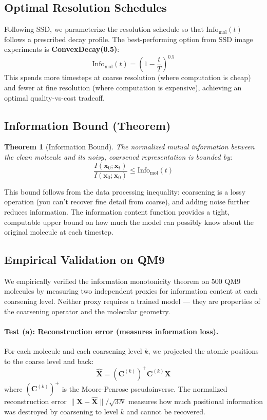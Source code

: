 \documentclass[12pt,a4paper]{article}
\newtheorem{theorem}{Theorem}
\begin{document}
\subsection{Optimal Resolution Schedules}

Following SSD, we parameterize the resolution schedule so that $\text{Info}_{\text{mol}}(t)$ follows a prescribed decay profile. The best-performing option from SSD image experiments is \textbf{ConvexDecay(0.5)}:
\[
\text{Info}_{\text{mol}}(t) = \left(1 - \frac{t}{T}\right)^{0.5}
\]
This spends more timesteps at coarse resolution (where computation is cheap) and fewer at fine resolution (where computation is expensive), achieving an optimal quality-vs-cost tradeoff.

\subsection{Information Bound (Theorem)}

\begin{theorem}[Information Bound]
The normalized mutual information between the clean molecule and its noisy, coarsened representation is bounded by:
\[
\frac{I(\bm{x}_0; \bm{x}_t)}{I(\bm{x}_0; \bm{x}_0)} \leq \text{Info}_{\text{mol}}(t)
\]
\end{theorem}

This bound follows from the data processing inequality: coarsening is a lossy operation (you can't recover fine detail from coarse), and adding noise further reduces information. The information content function provides a tight, computable upper bound on how much the model can possibly know about the original molecule at each timestep.

\subsection{Empirical Validation on QM9}

We empirically verified the information monotonicity theorem on 500 QM9 molecules by measuring two independent proxies for information content at each coarsening level. Neither proxy requires a trained model --- they are properties of the coarsening operator and the molecular geometry.

\paragraph{Test (a): Reconstruction error (measures information loss).}
For each molecule and each coarsening level $k$, we projected the atomic positions to the coarse level and back:
\[
\hat{\bm{X}} = (\bm{C}^{(k)})^+ \bm{C}^{(k)} \bm{X}
\]
where $(\bm{C}^{(k)})^+$ is the Moore-Penrose pseudoinverse. The normalized reconstruction error $\|\bm{X} - \hat{\bm{X}}\| / \sqrt{3N}$ measures how much positional information was destroyed by coarsening to level $k$ and cannot be recovered.
\end{document}
